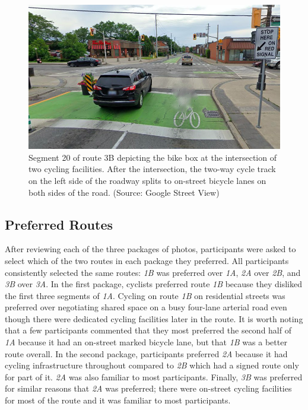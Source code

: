 \documentclass[]{elsarticle} %
\begin{document}
\begin{figure}

{\centering \includegraphics[width=0.65\linewidth]{Figure 29} 

}

\caption{Segment 20 of route 3B depicting the bike box at the intersection of two cycling facilities. After the intersection, the two-way cycle track on the left side of the roadway splits to on-street bicycle lanes on both sides of the road. (Source: Google Street View)}\label{fig:figure-30}
\end{figure}

\hypertarget{preferred-routes}{%
\subsection{Preferred Routes}\label{preferred-routes}}

After reviewing each of the three packages of photos, participants were
asked to select which of the two routes in each package they preferred.
All participants consistently selected the same routes: \emph{1B} was
preferred over \emph{1A}, \emph{2A} over \emph{2B}, and \emph{3B} over
\emph{3A}. In the first package, cyclists preferred route \emph{1B}
because they disliked the first three segments of \emph{1A}. Cycling on
route \emph{1B} on residential streets was preferred over negotiating
shared space on a busy four-lane arterial road even though there were
dedicated cycling facilities later in the route. It is worth noting that
a few participants commented that they most preferred the second half of
\emph{1A} because it had an on-street marked bicycle lane, but that
\emph{1B} was a better route overall. In the second package,
participants preferred \emph{2A} because it had cycling infrastructure
throughout compared to \emph{2B} which had a signed route only for part
of it. \emph{2A} was also familiar to most participants. Finally,
\emph{3B} was preferred for similar reasons that \emph{2A} was
preferred; there were on-street cycling facilities for most of the route
and it was familiar to most participants.
\end{document}
